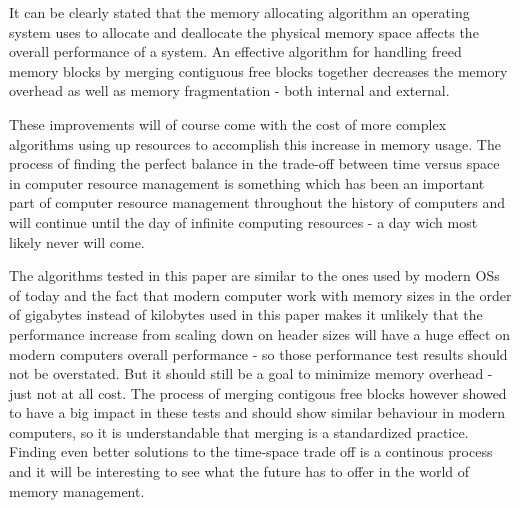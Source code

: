 \documentclass{article}
\begin{document}
It can be clearly stated that the memory allocating algorithm an operating system uses to allocate and deallocate
 the physical memory space affects the overall performance of a system. An effective algorithm for handling 
 freed memory blocks by merging contiguous free blocks together decreases the memory overhead as well as 
 memory fragmentation - both internal and external.
 
 These improvements will of course come with the cost of more complex algorithms using up resources to accomplish this 
 increase in memory usage. The process of finding the perfect balance in the trade-off between time versus space in computer resource 
 management is something which has been an important part of computer resource management throughout the history of computers and 
 will continue until the day of infinite computing resources - a day wich most likely never will come. 
 
 The algorithms tested in this paper are similar to the ones used by modern OSs of today and the fact that modern computer work 
 with memory sizes in the order of gigabytes instead of kilobytes used in this paper makes it unlikely that the performance increase 
 from scaling down on header sizes will have a huge effect on modern computers overall performance - so those performance test results 
 should not be overstated. But it should still be a goal to minimize memory overhead - just not at all cost.
 The process of merging contigous free blocks however showed to have a big impact in these tests and should show similar behaviour 
 in modern computers, so it is understandable that merging is a standardized practice. Finding even better solutions to the time-space 
 trade off is a continous process and it will be interesting to see what the future has to offer in the world of memory management.
\end{document}
